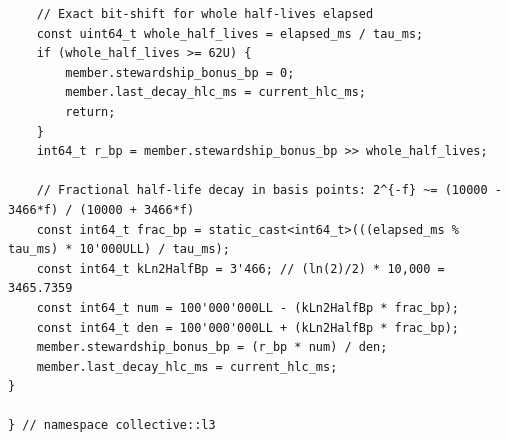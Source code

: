 \begin{lstlisting}
    // Exact bit-shift for whole half-lives elapsed
    const uint64_t whole_half_lives = elapsed_ms / tau_ms;
    if (whole_half_lives >= 62U) {
        member.stewardship_bonus_bp = 0;
        member.last_decay_hlc_ms = current_hlc_ms;
        return;
    }
    int64_t r_bp = member.stewardship_bonus_bp >> whole_half_lives;

    // Fractional half-life decay in basis points: 2^{-f} ~= (10000 - 3466*f) / (10000 + 3466*f)
    const int64_t frac_bp = static_cast<int64_t>(((elapsed_ms % tau_ms) * 10'000ULL) / tau_ms);
    const int64_t kLn2HalfBp = 3'466; // (ln(2)/2) * 10,000 = 3465.7359
    const int64_t num = 100'000'000LL - (kLn2HalfBp * frac_bp);
    const int64_t den = 100'000'000LL + (kLn2HalfBp * frac_bp);
    member.stewardship_bonus_bp = (r_bp * num) / den;
    member.last_decay_hlc_ms = current_hlc_ms;
}

} // namespace collective::l3
\end{lstlisting}
